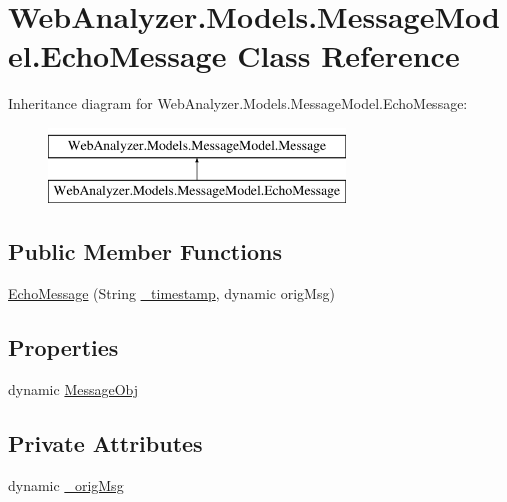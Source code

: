 \hypertarget{class_web_analyzer_1_1_models_1_1_message_model_1_1_echo_message}{}\section{Web\+Analyzer.\+Models.\+Message\+Model.\+Echo\+Message Class Reference}
\label{class_web_analyzer_1_1_models_1_1_message_model_1_1_echo_message}
Inheritance diagram for Web\+Analyzer.\+Models.\+Message\+Model.\+Echo\+Message\+:\begin{figure}[H]
\begin{center}
\leavevmode
\includegraphics[height=2.000000cm]{class_web_analyzer_1_1_models_1_1_message_model_1_1_echo_message}
\end{center}
\end{figure}
\subsection*{Public Member Functions}
\begin{DoxyCompactItemize}
\item 
\hyperlink{class_web_analyzer_1_1_models_1_1_message_model_1_1_echo_message_a17c4657c77bf651848d58fdca8c4998a}{Echo\+Message} (String \hyperlink{class_web_analyzer_1_1_models_1_1_message_model_1_1_message_ae1e243f35e213e08ec2bdc54f64b0d2e}{\+\_\+timestamp}, dynamic orig\+Msg)
\end{DoxyCompactItemize}
\subsection*{Properties}
\begin{DoxyCompactItemize}
\item 
dynamic \hyperlink{class_web_analyzer_1_1_models_1_1_message_model_1_1_echo_message_a547379308602e0e2a8af2a9790d3e9a4}{Message\+Obj}
\end{DoxyCompactItemize}
\subsection*{Private Attributes}
\begin{DoxyCompactItemize}
\item 
dynamic \hyperlink{class_web_analyzer_1_1_models_1_1_message_model_1_1_echo_message_ab768c1c02458db990e061e552c794f14}{\+\_\+orig\+Msg}
\end{DoxyCompactItemize}
